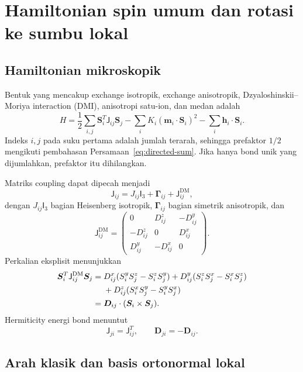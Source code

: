 \documentclass[11pt,a4paper]{article}
\newcommand{\vS}{\bm S}
\newcommand{\vh}{\bm h}
\newcommand{\vD}{\bm D}
\newcommand{\mJ}{\mathsf J}
\newcommand{\identity}{\mathsf I}
\begin{document}
\section{Hamiltonian spin umum dan rotasi ke sumbu lokal}

\subsection{Hamiltonian mikroskopik}

Bentuk yang mencakup exchange isotropik, exchange anisotropik, Dzyaloshinskii--Moriya interaction (DMI), anisotropi satu-ion, dan medan adalah
\begin{equation}
H=
\frac12\sum_{i,j}\vS_i^T\mJ_{ij}\vS_j
-\sum_iK_i(\widehat{\bm m}_i\cdot\vS_i)^2
-\sum_i\vh_i\cdot\vS_i.
\label{eq:general-hamiltonian}
\end{equation}
Indeks $i,j$ pada suku pertama adalah jumlah terarah, sehingga prefaktor $1/2$ mengikuti pembahasan Persamaan~\eqref{eq:directed-sum}. Jika hanya bond unik yang dijumlahkan, prefaktor itu dihilangkan.

Matriks coupling dapat dipecah menjadi
\begin{equation}
\mJ_{ij}=J_{ij}\identity_3+\bm\Gamma_{ij}+\mJ_{ij}^{\mathrm{DM}},
\end{equation}
dengan $J_{ij}\identity_3$ bagian Heisenberg isotropik, $\bm\Gamma_{ij}$ bagian simetrik anisotropik, dan
\begin{equation}
\mJ_{ij}^{\mathrm{DM}}=
\begin{pmatrix}
0&D_{ij}^z&-D_{ij}^y\\
-D_{ij}^z&0&D_{ij}^x\\
D_{ij}^y&-D_{ij}^x&0
\end{pmatrix}.
\end{equation}
Perkalian eksplisit menunjukkan
\begin{align}
\vS_i^T\mJ_{ij}^{\mathrm{DM}}\vS_j
={}&D_{ij}^x(S_i^yS_j^z-S_i^zS_j^y)
+D_{ij}^y(S_i^zS_j^x-S_i^xS_j^z)\notag\\
&+D_{ij}^z(S_i^xS_j^y-S_i^yS_j^x)\\
={}&\vD_{ij}\cdot(\vS_i\times\vS_j).
\end{align}
Hermiticity energi bond menuntut
\begin{equation}
\mJ_{ji}=\mJ_{ij}^{T},
\qquad
\vD_{ji}=-\vD_{ij}.
\end{equation}

\subsection{Arah klasik dan basis ortonormal lokal}
\end{document}
